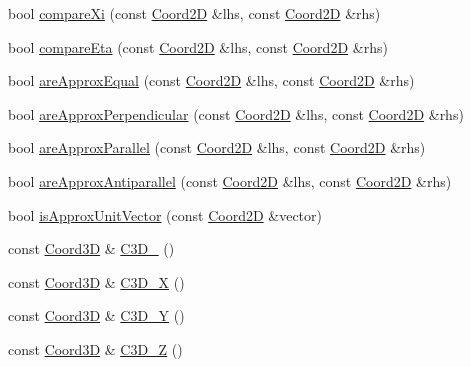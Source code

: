 \begin{DoxyCompactItemize}
\item 
bool \hyperlink{namespaceMcCAD_1_1Geometry_a4eeda1c28d0134d4526b7ec0c4647ad1}{compare\+Xi} (const \hyperlink{classMcCAD_1_1Geometry_1_1Coord2D}{Coord2D} \&lhs, const \hyperlink{classMcCAD_1_1Geometry_1_1Coord2D}{Coord2D} \&rhs)
\item 
bool \hyperlink{namespaceMcCAD_1_1Geometry_ae8dcca15e60e44f6e98108cb0a724f30}{compare\+Eta} (const \hyperlink{classMcCAD_1_1Geometry_1_1Coord2D}{Coord2D} \&lhs, const \hyperlink{classMcCAD_1_1Geometry_1_1Coord2D}{Coord2D} \&rhs)
\item 
bool \hyperlink{namespaceMcCAD_1_1Geometry_ae8bd48b3f8822b1bd3c8e9f0d13eeb97}{are\+Approx\+Equal} (const \hyperlink{classMcCAD_1_1Geometry_1_1Coord2D}{Coord2D} \&lhs, const \hyperlink{classMcCAD_1_1Geometry_1_1Coord2D}{Coord2D} \&rhs)
\item 
bool \hyperlink{namespaceMcCAD_1_1Geometry_a04e507abd8d33cbd2ffc90b829c9f37a}{are\+Approx\+Perpendicular} (const \hyperlink{classMcCAD_1_1Geometry_1_1Coord2D}{Coord2D} \&lhs, const \hyperlink{classMcCAD_1_1Geometry_1_1Coord2D}{Coord2D} \&rhs)
\item 
bool \hyperlink{namespaceMcCAD_1_1Geometry_a5f22eddbae2e5a4f839f409d20d54330}{are\+Approx\+Parallel} (const \hyperlink{classMcCAD_1_1Geometry_1_1Coord2D}{Coord2D} \&lhs, const \hyperlink{classMcCAD_1_1Geometry_1_1Coord2D}{Coord2D} \&rhs)
\item 
bool \hyperlink{namespaceMcCAD_1_1Geometry_a7bca12a64777ad23b8f76b31abd4aefb}{are\+Approx\+Antiparallel} (const \hyperlink{classMcCAD_1_1Geometry_1_1Coord2D}{Coord2D} \&lhs, const \hyperlink{classMcCAD_1_1Geometry_1_1Coord2D}{Coord2D} \&rhs)
\item 
bool \hyperlink{namespaceMcCAD_1_1Geometry_ab34c80e280caaad281b88d58940425af}{is\+Approx\+Unit\+Vector} (const \hyperlink{classMcCAD_1_1Geometry_1_1Coord2D}{Coord2D} \&vector)
\item 
const \hyperlink{classMcCAD_1_1Geometry_1_1Coord3D}{Coord3D} \& \hyperlink{namespaceMcCAD_1_1Geometry_a93fd5c6be0d76b39b101166f54da0a47}{C3\+D\+\_} ()
\item 
const \hyperlink{classMcCAD_1_1Geometry_1_1Coord3D}{Coord3D} \& \hyperlink{namespaceMcCAD_1_1Geometry_a5b06377b725bf2704cc1baf85b0cf1d8}{C3\+D\+\_\+X} ()
\item 
const \hyperlink{classMcCAD_1_1Geometry_1_1Coord3D}{Coord3D} \& \hyperlink{namespaceMcCAD_1_1Geometry_a105e7dca9e9dc438103f086675d987af}{C3\+D\+\_\+Y} ()
\item 
const \hyperlink{classMcCAD_1_1Geometry_1_1Coord3D}{Coord3D} \& \hyperlink{namespaceMcCAD_1_1Geometry_a6995a84d409796aa67e06a115cdc5803}{C3\+D\+\_\+Z} ()

\end{DoxyCompactItemize}
